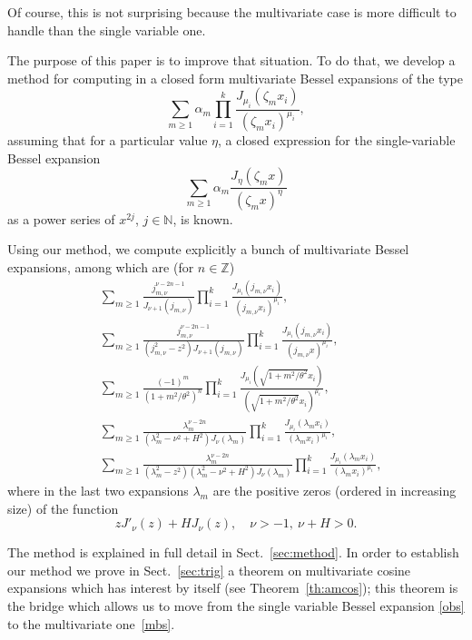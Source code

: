 \documentclass[12pt,leqno]{amsart}
\numberwithin{equation}{section}
\theoremstyle{plain}
\newcommand{\ZZ}{\mathbb{Z}}
\newcommand{\NN}{\mathbb{N}}
\begin{document}
Of course, this is not surprising because the multivariate case is more difficult to handle than the single variable one.

The purpose of this paper is to improve that situation. To do that, we develop a method for computing in a closed form
multivariate Bessel expansions of the type
\begin{equation}
\label{mbs}
\sum_{m\ge 1}\alpha_m \prod_{i=1}^k \frac{J_{\mu_i}(\zeta_m x_i)}{(\zeta_m x_i)^{\mu_i}},
\end{equation}
assuming that for a particular value $\eta$, a closed expression for the single-variable Bessel expansion
\begin{equation}
\label{obs}
\sum_{m\ge 1}\alpha_m \frac{J_{\eta}(\zeta_m x)}{(\zeta_m x)^\eta}
\end{equation}
as a power series of $x^{2j}$, $j\in \NN$, is known.

Using our method, we compute explicitly a bunch of multivariate Bessel expansions, among which are (for $n\in \ZZ$)
\begin{align}
\label{ex2}
& \sum_{m\ge 1} \frac{j_{m,\nu}^{\nu-2n-1}}{J_{\nu+1}(j_{m,\nu})} \prod_{i=1}^k \frac{J_{\mu_i}(j_{m,\nu}x_i)}
{(j_{m,\nu}x_i)^{\mu_i}},\\
\label{ex3}
& \sum_{m\ge 1}\frac{j_{m,\nu}^{\nu-2n-1}}{(j_{m,\nu}^2-z^2)J_{\nu+ 1}(j_{m,\nu})}
\prod_{i=1}^k \frac{J_{\mu_i}(j_{m,\nu} x_i)}{(j_{m,\nu}x)^{\mu_i}},\\
\label{exn}
& \sum_{m\ge 1} \frac{(-1)^m}{(1+m^2/\theta^2)^{n}}
\prod_{i=1}^k \frac{J_{\mu_i}(\sqrt{1+m^2/\theta^2}x_i)}
{(\sqrt{1+m^2/\theta^2}x_i)^{\mu_i}},
\\
\label{exd}
& \sum_{m\ge 1} \frac{\lambda_{m}^{\nu-2n}}{(\lambda_{m}^2-\nu^2+H^2)J_\nu(\lambda_{m})}
\prod_{i=1}^k\frac{J_{\mu_i}(\lambda_{m}x_i)}
{(\lambda_{m}x_i)^{\mu_i}},
\\
\label{exd2}
& \sum_{m\ge 1} \frac{\lambda_{m}^{\nu-2n}}{(\lambda_{m}^2-z^2)(\lambda_{m}^2-\nu^2+H^2)J_\nu(\lambda_{m})} 
\prod_{i=1}^k \frac{J_{\mu_i}(\lambda_{m}x_i)}
{(\lambda_{m}x_i)^{\mu_i}},
\end{align}
where in the last two expansions $\lambda_m$ are the positive zeros (ordered in increasing size) of the function
\[
zJ'_\nu(z)+HJ_\nu(z),\quad \nu>-1,\ \nu+H>0.
\]

The method is explained in full detail in Sect.~\ref{sec:method}.
In order to establish our method we prove in Sect.~\ref{sec:trig} a theorem on multivariate cosine expansions which has interest by itself (see Theorem~\ref{th:amcos}); this theorem is the bridge which allows us to
move from the single variable Bessel expansion \eqref{obs} to the multivariate one~\eqref{mbs}.
\end{document}
